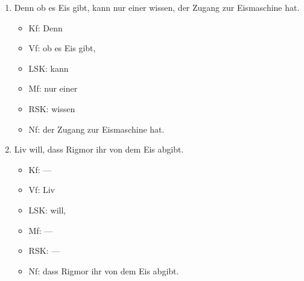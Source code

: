 \begin{enumerate}
  \item Denn ob es Eis gibt, kann nur einer wissen, der Zugang zur Eismaschine hat.
    \begin{itemize}
      \item Kf: Denn
      \item Vf: ob es Eis gibt,
      \item LSK: kann
      \item Mf: nur einer
      \item RSK: wissen
      \item Nf: der Zugang zur Eismaschine hat.
    \end{itemize}
  \item Liv will, dass Rigmor ihr von dem Eis abgibt.
    \begin{itemize}
      \item Kf: ---
      \item Vf: Liv
      \item LSK: will,
      \item Mf: ---
      \item RSK: ---
      \item Nf: dass Rigmor ihr von dem Eis abgibt.
    \end{itemize}
\end{enumerate}

\label{sol:saetze03}

